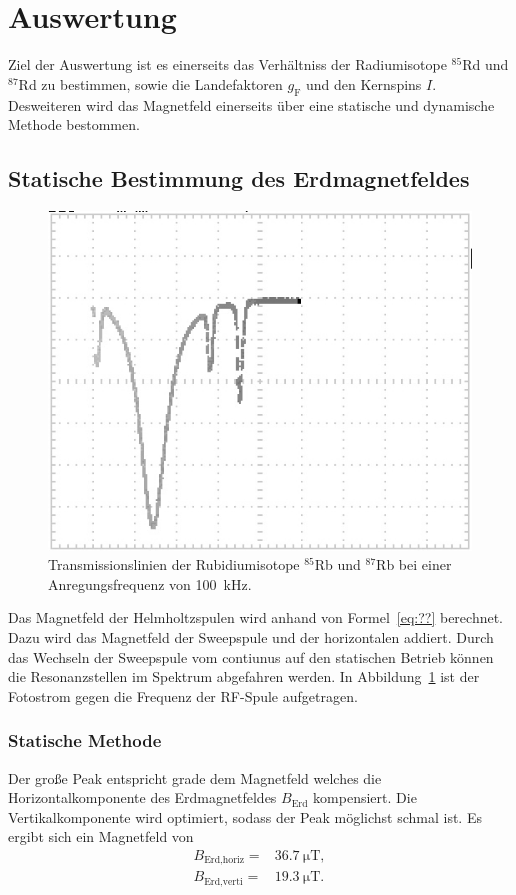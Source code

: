 \section{Auswertung}%
\label{sec:auswertung}

Ziel der Auswertung ist es einerseits das Verhältniss der Radiumisotope
$^{85}$Rd und $^{87}$Rd zu bestimmen, sowie die Landefaktoren $g_\text{F}$ und
den Kernspins $I$.
Desweiteren wird das Magnetfeld einerseits über eine statische und dynamische
Methode bestommen.
\subsection{Statische Bestimmung des Erdmagnetfeldes}%
\label{sub:statische_bestimmung_des_erdmagnetfeldes}
\begin{figure}
	\centering
	\includegraphics[width=\linewidth]{picture/Transmission_Spek_cut.JPG}
	\caption{Transmissionslinien der Rubidiumisotope $^{85}$Rb und $^{87}$Rb bei
	einer Anregungsfrequenz von \SI{100}{\kilo\hertz}.}
	\label{fig:transmission}
\end{figure}
Das Magnetfeld der Helmholtzspulen wird anhand von Formel~\ref{eq:??} 
berechnet. 
Dazu wird das Magnetfeld der Sweepspule und der horizontalen addiert. 
Durch das Wechseln der Sweepspule vom contiunus auf den statischen Betrieb
können die Resonanzstellen im Spektrum abgefahren werden.
In Abbildung~\ref{fig:transmission} ist der Fotostrom gegen die Frequenz der
RF-Spule aufgetragen. 

\subsubsection{Statische Methode}%
\label{ssub:subsubsection_name}
Der große Peak entspricht grade dem Magnetfeld welches die Horizontalkomponente
des Erdmagnetfeldes $B_\text{Erd}$ kompensiert.
Die Vertikalkomponente wird optimiert, sodass der Peak möglichst schmal ist. 
Es ergibt sich ein Magnetfeld von 
\begin{eqnarray}
	B_\text{Erd,horiz} =& \SI{36.7}{\micro\tesla}, \\
	B_\text{Erd,verti} =& \SI{19.3}{\micro\tesla}. 
\end{eqnarray}

